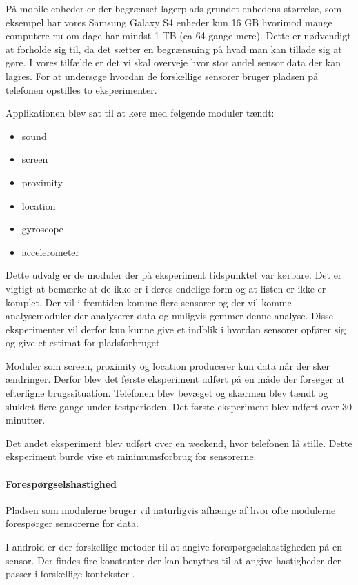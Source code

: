 På mobile enheder er der begrænset lagerplads grundet enhedens størrelse, som eksempel har vores Samsung Galaxy S4 enheder kun 16 GB hvorimod mange computere nu om dage har mindst 1 TB (ca 64 gange mere).
Dette er nødvendigt at forholde sig til, da det sætter en begrænsning på hvad man kan tillade sig at gøre.
I vores tilfælde er det vi skal overveje hvor stor andel sensor data der kan lagres.
For at undersøge hvordan de forskellige sensorer bruger pladsen på telefonen opstilles to eksperimenter.

Applikationen blev sat til at køre med følgende moduler tændt:
\begin{itemize}
	\item sound
	\item screen
	\item proximity
	\item location
	\item gyroscope
	\item accelerometer
\end{itemize}

Dette udvalg er de moduler der på eksperiment tidspunktet var kørbare.
Det er vigtigt at bemærke at de ikke er i deres endelige form og at listen er ikke er komplet.
Der vil i fremtiden komme flere sensorer og der vil komme analysemoduler der analyserer data og muligvis gemmer denne analyse.
Disse eksperimenter vil derfor kun kunne give et indblik i hvordan sensorer opfører sig og give et estimat for pladsforbruget.

Moduler som screen, proximity og location producerer kun data når der sker ændringer. 
Derfor blev det første eksperiment udført på en måde der forsøger at efterligne brugssituation. 
Telefonen blev bevæget og skærmen blev tændt og slukket flere gange under testperioden.
Det første eksperiment blev udført over 30 minutter.

Det andet eksperiment blev udført over en weekend, hvor telefonen lå stille.
Dette eksperiment burde vise et minimumsforbrug for sensorerne.

\paragraph{Forespørgselshastighed}
Pladsen som modulerne bruger vil naturligvis afhænge af hvor ofte modulerne forespørger sensorerne for data.

I android er der forskellige metoder til at angive forespørgselshastigheden på en sensor.
Der findes fire konstanter der kan benyttes til at angive hastigheder der passer i forskellige kontekster \cite{sensormonitor}.

